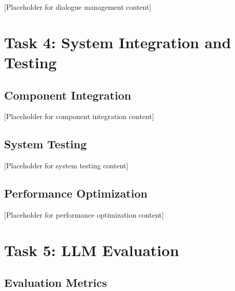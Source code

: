 \documentclass[12pt,a4paper]{article}
\begin{document}

[Placeholder for dialogue management content]

\section{Task 4: System Integration and Testing}


\subsection{Component Integration}


[Placeholder for component integration content]

\subsection{System Testing}


[Placeholder for system testing content]

\subsection{Performance Optimization}


[Placeholder for performance optimization content]

\section{Task 5: LLM Evaluation}


\subsection{Evaluation Metrics}
\end{document}
